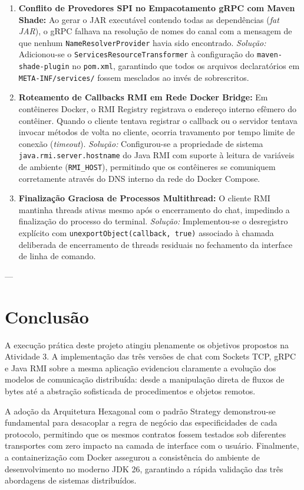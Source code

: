\documentclass[12pt,a4paper]{article}
\begin{document}
\begin{enumerate}
    \item \textbf{Conflito de Provedores SPI no Empacotamento gRPC com Maven Shade:}
    Ao gerar o JAR executável contendo todas as dependências (\textit{fat JAR}), o gRPC falhava na resolução de nomes do canal com a mensagem de que nenhum \texttt{NameResolverProvider} havia sido encontrado. 
    \textit{Solução:} Adicionou-se o \texttt{ServicesResourceTransformer} à configuração do \texttt{maven-shade-plugin} no \texttt{pom.xml}, garantindo que todos os arquivos declaratórios em \texttt{META-INF/services/} fossem mesclados ao invés de sobrescritos.
    
    \item \textbf{Roteamento de Callbacks RMI em Rede Docker Bridge:}
    Em contêineres Docker, o RMI Registry registrava o endereço interno efêmero do contêiner. Quando o cliente tentava registrar o callback ou o servidor tentava invocar métodos de volta no cliente, ocorria travamento por tempo limite de conexão (\textit{timeout}).
    \textit{Solução:} Configurou-se a propriedade de sistema \texttt{java.rmi.server.hostname} do Java RMI com suporte à leitura de variáveis de ambiente (\texttt{RMI\_HOST}), permitindo que os contêineres se comuniquem corretamente através do DNS interno da rede do Docker Compose.
    
    \item \textbf{Finalização Graciosa de Processos Multithread:}
    O cliente RMI mantinha threads ativas mesmo após o encerramento do chat, impedindo a finalização do processo do terminal.
    \textit{Solução:} Implementou-se o desregistro explícito com \texttt{unexportObject(callback, true)} associado à chamada deliberada de encerramento de threads residuais no fechamento da interface de linha de comando.
\end{enumerate}

---

\section{Conclusão}

A execução prática deste projeto atingiu plenamente os objetivos propostos na Atividade 3. A implementação das três versões de chat com Sockets TCP, gRPC e Java RMI sobre a mesma aplicação evidenciou claramente a evolução dos modelos de comunicação distribuída: desde a manipulação direta de fluxos de bytes até a abstração sofisticada de procedimentos e objetos remotos.

A adoção da Arquitetura Hexagonal com o padrão Strategy demonstrou-se fundamental para desacoplar a regra de negócio das especificidades de cada protocolo, permitindo que os mesmos contratos fossem testados sob diferentes transportes com zero impacto na camada de interface com o usuário. Finalmente, a containerização com Docker assegurou a consistência do ambiente de desenvolvimento no moderno JDK 26, garantindo a rápida validação das três abordagens de sistemas distribuídos.
\end{document}
